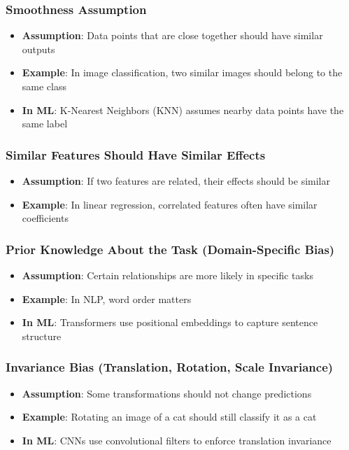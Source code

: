 \subsubsection{Smoothness Assumption}
\begin{itemize}
    \item \textbf{Assumption}: Data points that are close together should have similar outputs
    \item \textbf{Example}: In image classification, two similar images should belong to the same class
    \item \textbf{In ML}: K-Nearest Neighbors (KNN) assumes nearby data points have the same label
\end{itemize}

\subsubsection{Similar Features Should Have Similar Effects}
\begin{itemize}
    \item \textbf{Assumption}: If two features are related, their effects should be similar
    \item \textbf{Example}: In linear regression, correlated features often have similar coefficients
\end{itemize}

\subsubsection{Prior Knowledge About the Task (Domain-Specific Bias)}
\begin{itemize}
    \item \textbf{Assumption}: Certain relationships are more likely in specific tasks
    \item \textbf{Example}: In NLP, word order matters
    \item \textbf{In ML}: Transformers use positional embeddings to capture sentence structure
\end{itemize}

\subsubsection{Invariance Bias (Translation, Rotation, Scale Invariance)}
\begin{itemize}
    \item \textbf{Assumption}: Some transformations should not change predictions
    \item \textbf{Example}: Rotating an image of a cat should still classify it as a cat
    \item \textbf{In ML}: CNNs use convolutional filters to enforce translation invariance
\end{itemize}

